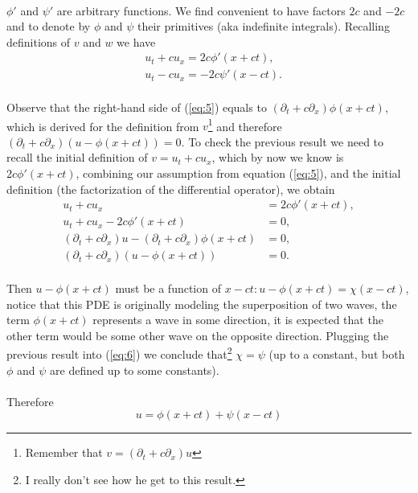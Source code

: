 \documentclass{article}
\begin{document}
\paragraph{}$\phi'$ and $\psi'$ are arbitrary functions. We find convenient to have factors $2c$ and $-2c$ and to denote by $\phi$ and $\psi$ their primitives (aka indefinite integrals). Recalling definitions of $v$ and $w$ we have
\begin{align*}
&u_t+cu_x=2c\phi'(x+ct),\\
&u_t-cu_x=-2c\psi'(x-ct).
\end{align*}
\paragraph{}Observe that the right-hand side of (\ref{eq:5}) equals to $(\partial_t + c\partial_x)\phi(x + ct)$, which is derived for the definition from $v$\footnote{Remember that $v= (\partial_t + c\partial_x)u$} and therefore $(\partial_t +c\partial_x)(u-\phi(x+ct))=0$. To check the previous result we need to recall the initial definition of $v = u_t + cu_x$, which by now we know is $2c\phi'(x+ct)$, combining our assumption from equation (\ref{eq:5}), and the initial definition (the factorization of the differential operator), we obtain
\begin{align*}
	u_t + cu_x &= 2c\phi'(x + ct),\\
	u_t + cu_x - 2c\phi'(x + ct) &= 0,\\
	(\partial_t + c\partial_x)u - (\partial_t + c\partial_x)\phi(x + ct) &= 0,\\
	(\partial_t + c\partial_x)(u-\phi(x + ct)) &= 0.
\end{align*}
\paragraph{}Then $u-\phi(x+ct)$ must be a function of $x-ct: u-\phi(x+ct)=\chi(x-ct)$, notice that this PDE is originally modeling the superposition of two waves, the term $\phi(x + ct)$ represents a wave in some direction, it is expected that the other term would be some other wave on the opposite direction. Plugging the previous result into (\ref{eq:6}) we conclude that\footnote{I really don't see how he get to this result.} $\chi=\psi$ (up to a constant, but both $\phi$ and $\psi$ are defined up to some constants).
\paragraph{}Therefore
\begin{equation}
	u = \phi(x + ct) + \psi(x - ct)\label{eq:7}
\end{equation}
\end{document}

